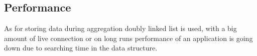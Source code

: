 \documentclass[12pt,a4paper]{article}
\begin{document}
    \subsection{Performance}
    As for storing data during aggregation doubly linked list is used, with a 
    big amount of live connection or on long runs performance of an application 
    is going down due to searching time in the data structure.


    \newpage
    \nocite{*}
    
    
\end{document}

